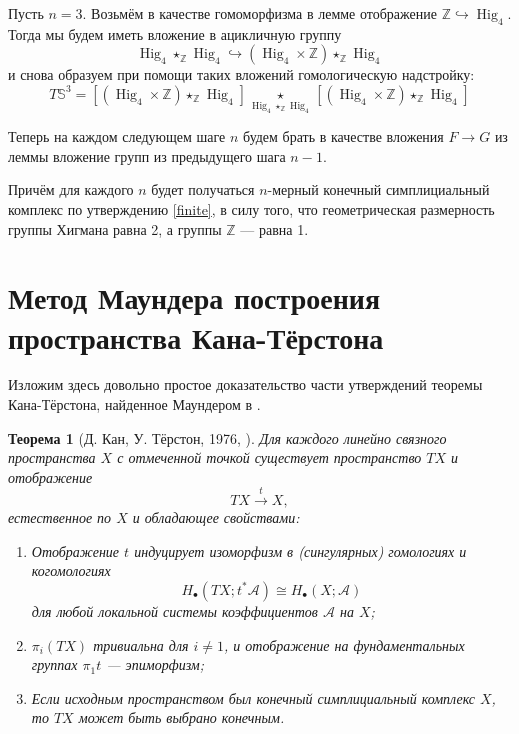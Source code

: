 \documentclass[14pt, dvipsnames]{extarticle}
\newtheorem{theorem}{Теорема}
\theoremstyle{definition}
\theoremstyle{remark}
\DeclareMathOperator{\Hig}{\mathrm{Hig}}
\begin{document}
Пусть $n=3$. Возьмём в качестве гомоморфизма в лемме отображение $\mathbb{Z}\hookrightarrow \Hig_4$. Тогда мы будем иметь вложение в ацикличную группу $$\Hig_4\star_\mathbb{Z}\Hig_4\hookrightarrow (\Hig_4\times \mathbb{Z})\star_{\mathbb{Z}}\Hig_4$$ и снова образуем при помощи таких вложений гомологическую надстройку: $$T\mathbb{S}^3 = \left [ (\Hig_4\times \mathbb{Z})\star_{\mathbb{Z}}\Hig_4 \right ] \underset{\Hig_{4}\star_{\mathbb{Z}}\Hig_{4}}{\star} \left [ (\Hig_4\times \mathbb{Z})\star_{\mathbb{Z}}\Hig_4 \right ]$$

Теперь на каждом следующем шаге $n$ будем брать в качестве вложения $F\to G$ из леммы вложение групп из предыдущего шага $n-1$.  

Причём для каждого $n$ будет получаться $n$-мерный конечный симплициальный комплекс по утверждению \ref{finite}, в силу того, что геометрическая размерность группы Хигмана равна 2, а группы $\mathbb{Z}$ --- равна 1. 











\section{Метод Маундера построения пространства Кана-Тёрстона}

Изложим здесь довольно простое доказательство части утверждений теоремы Кана-Тёрстона, найденное Маундером в \cite{Maunder}.

\begin{theorem}[Д. Кан, У. Тёрстон, 1976, \cite{Kan}]
Для каждого линейно связного пространства $X$ с отмеченной точкой существует пространство $TX$ и отображение $$TX\overset{t}{\to} X,$$ естественное по $X$ и обладающее свойствами:
\begin{enumerate}[\bf 1.]
\item Отображение $t$ индуцирует изоморфизм в (сингулярных) гомологиях и когомологиях $$H_\bullet(TX; t^\ast \mathcal{A})\cong H_\bullet(X; \mathcal{A})$$ для любой локальной системы коэффициентов $\mathcal{A}$ на $X$; 

\item $\pi_i(TX)$ тривиальна для $i\neq 1$, и отображение на фундаментальных группах $\pi_1t$ --- эпиморфизм;

\item Если исходным пространством был конечный симплициальный комплекс $X$, то $TX$ может быть выбрано конечным.
\end{enumerate}
\end{theorem}
\end{document}
